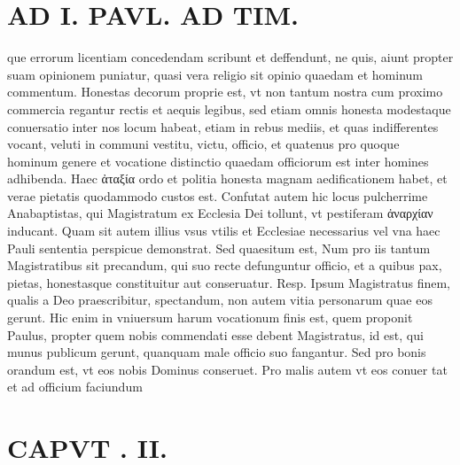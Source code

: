\documentclass{article}
\begin{document}
\begin{pages}
\section*{AD I. PAVL. AD TIM. }
\marginpar{[ p.50 ]}\pstart que errorum licentiam concedendam scribunt et deffendunt, ne quis, aiunt propter suam opinionem puniatur, quasi vera religio sit opinio quaedam et hominum commentum. Honestas decorum proprie est, vt non tantum nostra cum proximo commercia regantur rectis et aequis legibus, sed etiam omnis honesta modestaque conuersatio inter nos locum habeat, etiam in rebus mediis, et quas indifferentes vocant, veluti in communi vestitu, victu, officio, et quatenus pro quoque hominum genere et vocatione distinctio quaedam officiorum est inter homines adhibenda. Haec ἀταξία ordo et politia honesta magnam aedificationem habet, et verae pietatis quodammodo custos est. Confutat autem hic locus pulcherrime Anabaptistas, qui Magistratum ex Ecclesia Dei tollunt, vt pestiferam ἀναρχίαν inducant. Quam sit autem illius vsus vtilis et Ecclesiae necessarius vel vna haec Pauli sententia perspicue demonstrat. Sed quaesitum est, Num pro iis tantum Magistratibus sit precandum, qui suo recte defunguntur officio, et a quibus pax, pietas, honestasque constituitur aut conseruatur. Resp. Ipsum Magistratus finem, qualis a Deo praescribitur, spectandum, non autem vitia personarum quae eos gerunt. Hic enim in vniuersum harum vocationum finis est, quem proponit Paulus, propter quem nobis commendati esse debent Magistratus, id est, qui munus publicum gerunt, quanquam male officio suo fangantur. Sed pro bonis orandum est, vt eos nobis Dominus conseruet. Pro malis autem vt eos conuer tat et ad officium faciundum  \pend
\section*{CAPVT . II. }
\marginpar{[ p.51 ]}\pstart {}
{}

\end{pages}
\end{document}

